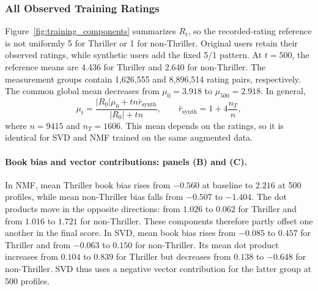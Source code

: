 \documentclass[information,article,submit,pdftex,moreauthors]{Definitions/mdpi}
\begin{document}
\subsubsection{All Observed Training Ratings}

Figure~\ref{fig:training_components} summarizes $R_t$, so the recorded-rating reference is not uniformly 5 for Thriller or 1 for non-Thriller. Original users retain their observed ratings, while synthetic users add the fixed 5/1 pattern. At $t=500$, the reference means are 4.436 for Thriller and 2.640 for non-Thriller. The measurement groups contain 1,626,555 and 8,896,514 rating pairs, respectively. The common global mean decreases from $\mu_0=3.918$ to $\mu_{500}=2.918$. In general,
\begin{equation}
\label{eq:training_augmented_mean}
\mu_t=\frac{|R_0|\mu_0+tn\bar r_{\mathrm{synth}}}{|R_0|+tn},
\qquad
\bar r_{\mathrm{synth}}=1+4\frac{n_T}{n},
\end{equation}
where $n=9415$ and $n_T=1606$. This mean depends on the ratings, so it is identical for SVD and NMF trained on the same augmented data.

\paragraph{Book bias and vector contributions: panels (B) and (C).}
In NMF, mean Thriller book bias rises from $-0.560$ at baseline to $2.216$ at 500 profiles, while mean non-Thriller bias falls from $-0.507$ to $-1.404$. The dot products move in the opposite directions: from $1.026$ to $0.062$ for Thriller and from $1.016$ to $1.721$ for non-Thriller. These components therefore partly offset one another in the final score. In SVD, mean book bias rises from $-0.085$ to $0.457$ for Thriller and from $-0.063$ to $0.150$ for non-Thriller. Its mean dot product increases from $0.104$ to $0.839$ for Thriller but decreases from $0.138$ to $-0.648$ for non-Thriller. SVD thus uses a negative vector contribution for the latter group at 500 profiles.
\end{document}
